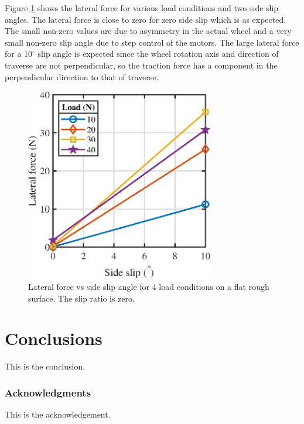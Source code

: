 \documentclass{article}
\begin{document}
Figure \ref{fig:lateral-force-vs-side-slip} shows the lateral force for various load conditions and two side slip angles. The lateral force is close to zero for zero side slip which is as expected. The small non-zero values are due to asymmetry in the actual wheel and a very small non-zero slip angle due to step control of the motors. The large lateral force for a 10$^\circ$ slip angle is expected since the wheel rotation axis and direction of traverse are not perpendicular, so the traction force has a component in the perpendicular direction to that of traverse.  

\begin{figure}[hbt!]
\centering
\includegraphics[width=3.25in]{plots/lateral-force-vs-side-slip.eps}
\caption{Lateral force vs side slip angle for 4 load conditions on a flat rough surface. The slip ratio is zero.}
\label{fig:lateral-force-vs-side-slip}
\end{figure}



\section{Conclusions}

This is the conclusion.

\subsubsection*{Acknowledgments}
This is the acknowledgement.




\end{document}
